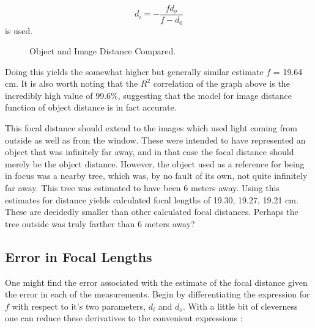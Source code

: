 \documentclass[]{article}
\begin{document}
\begin{equation}
d_i = -\frac{f d_o}{f - d_0}
\end{equation}
is used.
\begin{figure}[h]
	\centering
	\caption{Object and Image Distance Compared.}
\end{figure}
Doing this yields the somewhat higher but generally similar estimate \(f\) = 19.64 cm. It is also worth noting that the \(R^2\) correlation of the graph above is the incredibly high value of 99.6\%, suggesting that the model for image distance function of object distance is in fact accurate.

This focal distance should extend to the images which used light coming from outside as well as from the window. These were intended to have represented an object that was infinitely far away, and in that case the focal distance should merely be the object distance. However, the object used as a reference for being in focus was a nearby tree, which was, by no fault of its own, not quite infinitely far away. This tree was estimated to have been 6 meters away. Using this estimates for distance yields calculated focal lengths of 19.30, 19.27, 19.21 cm. These are decidedly smaller than other calculated focal distances. Perhaps the tree outside was truly farther than 6 meters away?

\subsection{Error in Focal Lengths}

One might find the error associated with the estimate of the focal distance given the error in each of the measurements. Begin by differentiating the expression for \(f\) with respect to it's two parameters, \(d_i\) and \(d_o\). With a little bit of cleverness one can reduce these derivatives to the convenient expressions :
\end{document}
